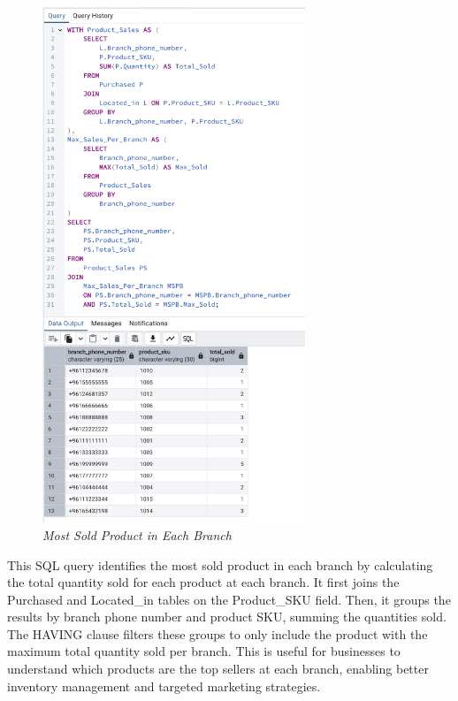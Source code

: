 \begin{figure}[H]
  \centering
  \includegraphics[width=0.7\textwidth]{images/sql/complex-queries/most_sold_product_in_each_branch.png}
  \caption{\textit{Most Sold Product in Each Branch}}
\end{figure}

This SQL query identifies the most sold product in each branch by calculating the total quantity sold for each product at each branch. It first joins the Purchased and Located\_in tables on the Product\_SKU field. Then, it groups the results by branch phone number and product SKU, summing the quantities sold. The HAVING clause filters these groups to only include the product with the maximum total quantity sold per branch. This is useful for businesses to understand which products are the top sellers at each branch, enabling better inventory management and targeted marketing strategies.

